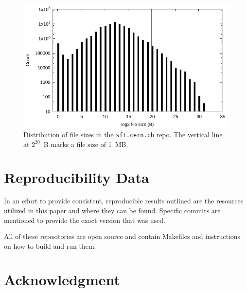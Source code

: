 \documentclass[conference]{IEEEtran}
\begin{document}
\begin{figure}
\includegraphics[width=\linewidth]{plots/file-hist/sft.pdf}
\caption{Distribution of file sizes in the \texttt{sft.cern.ch} repo.
The vertical line at $2^{20}$~B marks a file size of 1~MB.}
\end{figure}


\section{Reproducibility Data}

In an effort to provide consistent, reproducible results outlined are the
resources utilized in this paper and where they can be found.
Specific commits are mentioned to provide the exact version that was used.


All of these repositories are open source and contain Makefiles
and instructions on how to build and run them.

\section*{Acknowledgment}




\end{document}
